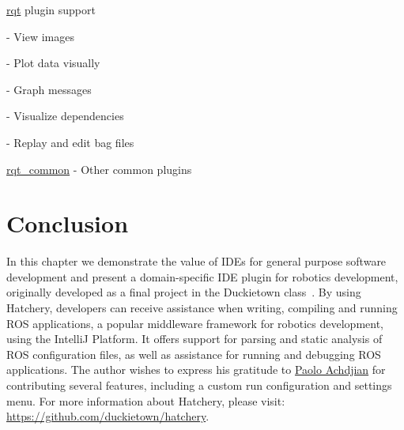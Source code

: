\begin{multicols}{2}
\begin{todolist}
\begin{todolist}
\end{todolist}
\item \href{https://wiki.ros.org/rqt}{rqt} plugin support
\begin{todolist}
\item[\done] \href{https://wiki.ros.org/rqt_image_view}{} - View images
\item[\done] \href{https://wiki.ros.org/rqt_plot}{} - Plot data visually
\item[\done] \href{https://wiki.ros.org/rqt_graph}{} - Graph messages
\item[\done] \href{https://wiki.ros.org/rqt_dep}{} - Visualize dependencies
\item[\done] \href{https://wiki.ros.org/rqt_bag}{} - Replay and edit bag files
\item \href{https://wiki.ros.org/rqt_common_plugins}{rqt\_common} - Other common plugins
\end{todolist}
\end{todolist}
\end{multicols}

\section{Conclusion}

In this chapter we demonstrate the value of IDEs for general purpose software development and present a domain-specific IDE plugin for robotics development, originally developed as a final project in the Duckietown class~\citep{paull2017duckietown}. By using Hatchery, developers can receive assistance when writing, compiling and running ROS applications, a popular middleware framework for robotics development, using the IntelliJ Platform. It offers support for parsing and static analysis of ROS configuration files, as well as assistance for running and debugging ROS applications. The author wishes to express his gratitude to \href{https://github.com/paoloach}{Paolo Achdjian} for contributing several features, including a custom run configuration and settings menu. For more information about Hatchery, please visit: \url{https://github.com/duckietown/hatchery}.